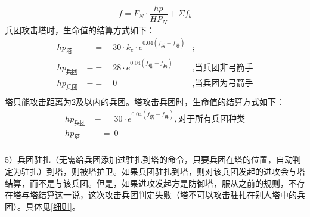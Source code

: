 \documentclass[a4paper,4pt]{article}
\begin{document}
\begin{equation}
  f = F_N \cdot \frac{hp}{HP_N} + \Sigma f_b\label{f}
\end{equation}
兵团攻击塔时，生命值的结算方式如下：
\begin{equation}
  \begin{aligned}
    hp_{\text{塔}}   & \ -= & \ 30 \cdot k_c \cdot e^{0.04(f_{\text{兵}}-f_{\text{塔}})} & ;                       \\
    hp_{\text{兵团}} & \ -= & \ 28 \cdot e^{0.04(f_{\text{塔}}-f_{\text{兵}})}           & , \text{当兵团非弓箭手} \\
    hp_{\text{兵团}} & \ -= & \ 0                                                        & , \text{当兵团为弓箭手} \\
  \end{aligned}
  \label{hp1}
\end{equation}
塔只能攻击距离为2及以内的兵团。塔攻击兵团时，生命值的结算方式如下：
\begin{equation}
  \begin{aligned}
    hp_{\text{兵团}} & \ -=\ 30 \cdot e^{0.04(f_{\text{塔}}-f_{\text{兵}})}, \text{对于所有兵团种类} \\
    hp_{\text{塔}}   & \ -=\ 0                                                                       \\
  \end{aligned}
  \label{hp2}
\end{equation}
\par
5）兵团驻扎（无需给兵团添加过驻扎到塔的命令，只要兵团在塔的位置，自动判定为驻扎）到塔，则被塔护卫。如果兵团驻扎到塔，则对该兵团发起的进攻会与塔结算，而不是与该兵团。但是，如果进攻发起方是防御塔，服从之前的规则，不存在塔与塔结算这一说，这次攻击兵团判定失败（塔不可以攻击驻扎在别人塔中的兵团）。具体见\ref{细则}。\par
\end{document}
